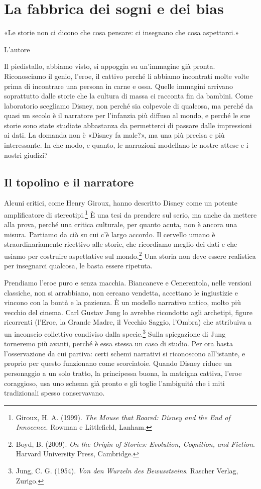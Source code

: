 \chapter{La fabbrica dei sogni e dei bias}
\label{cap:p2c24}

\epigraph{«Le storie non ci dicono che cosa pensare: ci insegnano che cosa aspettarci.»}{L'autore}

Il piedistallo, abbiamo visto, si appoggia su un'immagine già pronta. Riconosciamo il genio, l'eroe, il cattivo perché li abbiamo incontrati molte volte prima di incontrare una persona in carne e ossa. Quelle immagini arrivano soprattutto dalle storie che la cultura di massa ci racconta fin da bambini. Come laboratorio scegliamo Disney, non perché sia colpevole di qualcosa, ma perché da quasi un secolo è il narratore per l'infanzia più diffuso al mondo, e perché le sue storie sono state studiate abbastanza da permetterci di passare dalle impressioni ai dati. La domanda non è «Disney fa male?», ma una più precisa e più interessante. In che modo, e quanto, le narrazioni modellano le nostre attese e i nostri giudizi?

\section{Il topolino e il narratore}

Alcuni critici, come Henry Giroux, hanno descritto Disney come un potente amplificatore di stereotipi.\footnote{Giroux, H. A. (1999). \textit{The Mouse that Roared: Disney and the End of Innocence}. Rowman e Littlefield, Lanham.} È una tesi da prendere sul serio, ma anche da mettere alla prova, perché una critica culturale, per quanto acuta, non è ancora una misura. Partiamo da ciò su cui c'è largo accordo. Il cervello umano è straordinariamente ricettivo alle storie, che ricordiamo meglio dei dati e che usiamo per costruire aspettative sul mondo.\footnote{Boyd, B. (2009). \textit{On the Origin of Stories: Evolution, Cognition, and Fiction}. Harvard University Press, Cambridge.} Una storia non deve essere realistica per insegnarci qualcosa, le basta essere ripetuta.

Prendiamo l'eroe puro e senza macchia. Biancaneve e Cenerentola, nelle versioni classiche, non si arrabbiano, non cercano vendetta, accettano le ingiustizie e vincono con la bont\`{a} e la pazienza. È un modello narrativo antico, molto più vecchio del cinema. Carl Gustav Jung lo avrebbe ricondotto agli archetipi, figure ricorrenti (l'Eroe, la Grande Madre, il Vecchio Saggio, l'Ombra) che attribuiva a un inconscio collettivo condiviso dalla specie.\footnote{Jung, C. G. (1954). \textit{Von den Wurzeln des Bewusstseins}. Rascher Verlag, Zurigo.} Sulla spiegazione di Jung torneremo più avanti, perché è essa stessa un caso di studio. Per ora basta l'osservazione da cui partiva: certi schemi narrativi si riconoscono all'istante, e proprio per questo funzionano come scorciatoie. Quando Disney riduce un personaggio a un solo tratto, la principessa buona, la matrigna cattiva, l'eroe coraggioso, usa uno schema già pronto e gli toglie l'ambiguità che i miti tradizionali spesso conservavano.

